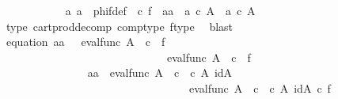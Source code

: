 \begin{isabellebody}
\isanewline
\ \ \ \ \ \ \ \ \ \ \isamarkupfalse%
\ a{}\ a{}\ \ phi{\isacharunderscore}{\kern0pt}f{\isacharunderscore}{\kern0pt}def{\isacharcolon}{\kern0pt}\ {\isachardoublequoteopen}{\isasymphi}\ {\isasymcirc}\isactrlsub c\ f\ {\isacharequal}{\kern0pt}\ {\isasymlangle}a{}{\isacharcomma}{\kern0pt}a{}{\isasymrangle}\ {\isasymand}\ a{}\ {\isasymin}\isactrlsub c\ A\ {\isasymand}\ a{}\ {\isasymin}\isactrlsub c\ A{\isachardoublequoteclose}\isanewline
\ \ \ \ \ \ \ \ \ \ \ \ \isamarkupfalse%
\ {\isasymphi}{\isacharunderscore}{\kern0pt}type\ cart{\isacharunderscore}{\kern0pt}prod{\isacharunderscore}{\kern0pt}decomp\ comp{\isacharunderscore}{\kern0pt}type\ f{\isacharunderscore}{\kern0pt}type\ \isamarkupfalse%
\ blast\isanewline
\ \ \ \ \ \ \ \ \ \ \isamarkupfalse%
\ equation{}{\isacharcolon}{\kern0pt}\ {\isachardoublequoteopen}{\isasymlangle}a{}{\isacharcomma}{\kern0pt}a{}{\isasymrangle}\ {\isacharequal}{\kern0pt}\ \ {\isasymlangle}eval{\isacharunderscore}{\kern0pt}func\ A\ {\isasymOmega}\ {\isasymcirc}\isactrlsub c\ {\isasymlangle}{\isasymt}{\isacharcomma}{\kern0pt}\ f{\isasymrangle}{\isacharcomma}{\kern0pt}\isanewline
\ \ \ \ \ \ \ \ \ \ \ \ \ \ \ \ \ \ \ \ \ \ \ \ \ \ \ \ \ \ eval{\isacharunderscore}{\kern0pt}func\ A\ {\isasymOmega}\ {\isasymcirc}\isactrlsub c\ {\isasymlangle}{\isasymf}{\isacharcomma}{\kern0pt}\ f{\isasymrangle}{\isasymrangle}{\isachardoublequoteclose}\isanewline
\ \ \ \ \ \ \ \ \ \ \isamarkupfalse%
\ {\isacharminus}{\kern0pt}\ \isanewline
\ \ \ \ \ \ \ \ \ \ \ \ \ \ \isamarkupfalse%
\ {\isachardoublequoteopen}{\isasymlangle}a{}{\isacharcomma}{\kern0pt}a{}{\isasymrangle}\ {\isacharequal}{\kern0pt}\ {\isasymlangle}eval{\isacharunderscore}{\kern0pt}func\ A\ {\isasymOmega}\ {\isasymcirc}\isactrlsub c\ {\isasymlangle}{\isasymt}\ {\isasymcirc}\isactrlsub c\ {\isasymbeta}\isactrlbsub A\isactrlbsup {\isasymOmega}\isactrlesup \isactrlesub {\isacharcomma}{\kern0pt}\ id{\isacharparenleft}{\kern0pt}A\isactrlbsup {\isasymOmega}\isactrlesup {\isacharparenright}{\kern0pt}{\isasymrangle}{\isacharcomma}{\kern0pt}\isanewline
\ \ \ \ \ \ \ \ \ \ \ \ \ \ \ \ \ \ \ \ \ \ \ \ \ \ \ \ \ \ \ \ \ \ eval{\isacharunderscore}{\kern0pt}func\ A\ {\isasymOmega}\ {\isasymcirc}\isactrlsub c\ {\isasymlangle}{\isasymf}\ {\isasymcirc}\isactrlsub c\ {\isasymbeta}\isactrlbsub A\isactrlbsup {\isasymOmega}\isactrlesup \isactrlesub {\isacharcomma}{\kern0pt}\ id{\isacharparenleft}{\kern0pt}A\isactrlbsup {\isasymOmega}\isactrlesup {\isacharparenright}{\kern0pt}{\isasymrangle}{\isasymrangle}\ {\isasymcirc}\isactrlsub c\ f{\isachardoublequoteclose}\isanewline

\end{isabellebody}
